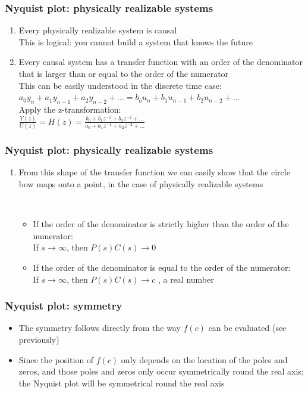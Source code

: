 \newcommand{\asuivre}{\setcounter{sauvegardeenumi}{\theenumi}}
\newcommand{\suite}{\setcounter{enumi}{\thesauvegardeenumi}}


\begin{frame}
\frametitle{Nyquist plot: physically realizable systems}
\begin{enumerate}
\item Every physically realizable system is causal
\\This is logical: you cannot build a system that knows the future
\item Every causal system has a transfer function with an order of the denominator that is larger than or equal to the order of the numerator
\\This can be easily understood in the discrete time case:
\\ $ a_0y_n + a_1y_{n-1} + a_2y_{n-2} + ... = b_ou_n + b_1u_{n-1} + b_2u_{n-2} + ...$
\\ Apply the z-transformation: 
\\$\frac{Y(z)}{U(z)}= H(z)= \frac{b_0+b_1z^{-1}+b_2z^{-2}+...}{a_0+a_1z^{-1}+a_2z^{-2}+...}$
\asuivre
\end{enumerate}
\end{frame}

\begin{frame}
\frametitle{Nyquist plot: physically realizable systems}
\begin{enumerate}
\suite
\item From this shape of the transfer function we can easily show that the circle bow maps onto a point, in the case of physically realizable systems


\\ \begin{itemize}
\item If the order of the denominator is strictly higher than the order of the numerator:\\ If $s\rightarrow \infty $, then $P(s)C(s) \rightarrow 0$
\item If the order of the denominator is equal to the order of the numerator:\\
If $s\rightarrow \infty $, then $P(s)C(s) \rightarrow c$ , a real number
\end{itemize}
\end{enumerate}
\end{frame}

\begin{frame}
\frametitle{Nyquist plot: symmetry}
\begin{itemize}
\item The symmetry follows directly from the way $f(c)$ can be evaluated (see previously)
\item Since the position of $f(c)$ only depends on the location of the poles and zeros, and those poles and zeros only occur symmetrically round the real axis; the Nyquist plot will be symmetrical round the real axis
\end{itemize}
\end{frame}

